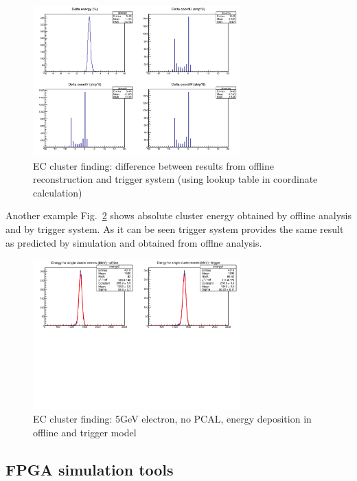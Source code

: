 \begin{figure}[htp]
	\begin{center}
		\centering
		\includegraphics[width=8cm]{img/ecal_sim2.png}
		\caption{EC cluster finding: difference between results from offline reconstruction and trigger system (using lookup table in coordinate calculation)}
		\label{fig:ecal_sim2}
	\end{center}
\end{figure} 

Another example Fig.~\ref{fig:ecal_sim3} shows absolute cluster energy obtained by offline analysis and by trigger system. As it can be seen trigger system provides the same result as predicted by simulation and obtained from offlne analysis.

\begin{figure}[htp]
	\begin{center}
		\centering
		\includegraphics[width=8cm]{img/ecal_sim3.png}
		\caption{EC cluster finding: 5GeV electron, no PCAL, energy deposition in offline and trigger model}
		\label{fig:ecal_sim3}
	\end{center}
\end{figure} 


\subsection{FPGA simulation tools}

